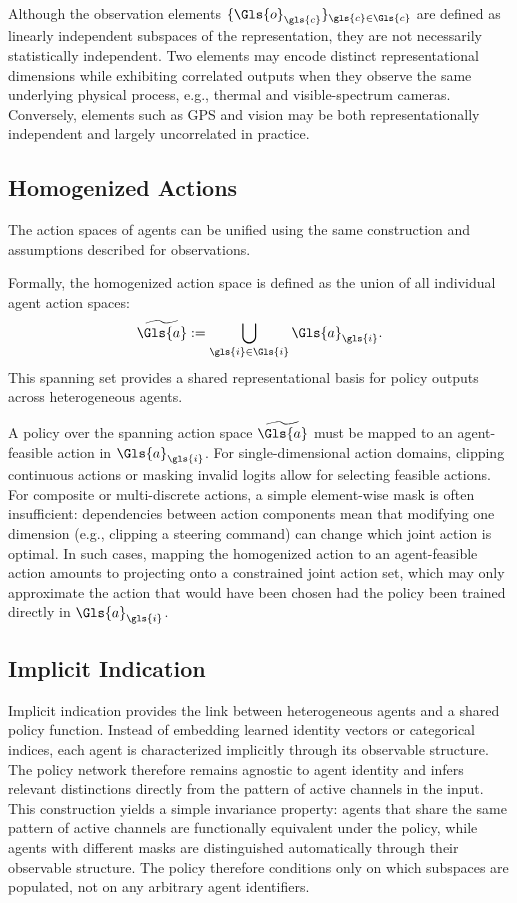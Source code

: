 \documentclass[]{jair}
\newcommand{\Hom}[1]{\widetilde{#1}}
\begin{document}
Although the observation elements \(\{\Gls{o}_{\gls{c}}\}_{\gls{c} \in \Gls{c}}\) are 
defined as linearly independent subspaces of the representation, 
they are not necessarily statistically independent. 
Two elements may encode distinct representational dimensions while 
exhibiting correlated outputs when they observe the same underlying 
physical process, e.g., thermal and visible-spectrum cameras. 
Conversely, elements such as GPS and vision may be both 
representationally independent and largely uncorrelated in practice. 

\subsection{Homogenized Actions}

The action spaces of agents can be unified using the same 
construction and assumptions described for observations. 

Formally, the homogenized action space is defined as the union 
of all individual agent action spaces:
\[
    \Hom{\Gls{a}} := \bigcup_{\gls{i} \in \Gls{i}} \Gls{a}_{\gls{i}}.
\]
This spanning set provides a shared representational basis for 
policy outputs across heterogeneous agents.

A policy over the spanning action space \(\Hom{\Gls{a}}\) 
must be mapped to an agent-feasible action in \(\Gls{a}_{\gls{i}}\).
For single-dimensional action domains, clipping continuous actions
or masking invalid logits allow for selecting feasible actions.
% 
For composite or multi-discrete actions, a simple element-wise 
mask is often insufficient: dependencies between action components 
mean that modifying one dimension (e.g., clipping a steering command) 
can change which joint action is optimal. 
In such cases, mapping the homogenized action to an agent-feasible 
action amounts to projecting onto a constrained joint action set, 
which may only approximate the action that would have been 
chosen had the policy been trained directly in \(\Gls{a}_{\gls{i}}\).

\subsection{Implicit Indication}

Implicit indication provides the link between 
heterogeneous agents and a shared policy function.
Instead of embedding learned identity vectors or categorical indices, 
each agent is characterized implicitly through its observable structure.
The policy network therefore remains agnostic to agent identity and infers 
relevant distinctions directly from the pattern of active channels in the input.
% 
This construction yields a simple invariance property: agents that share the 
same pattern of active channels are functionally equivalent under the policy, 
while agents with different masks are distinguished automatically through 
their observable structure. The policy therefore conditions only on which 
subspaces are populated, not on any arbitrary agent identifiers.
\end{document}
